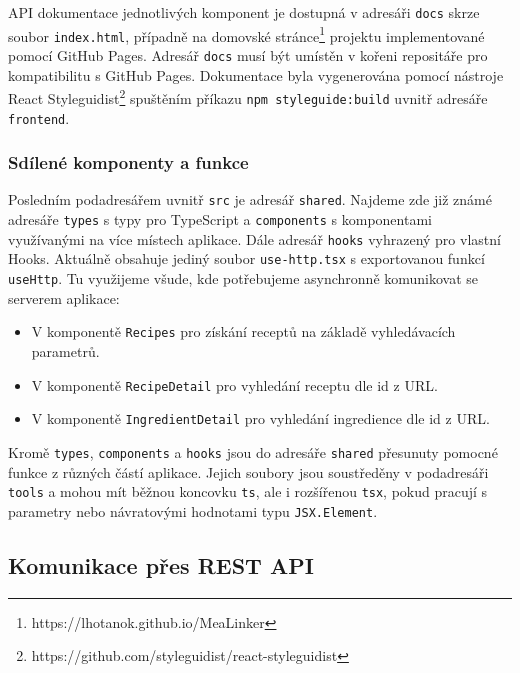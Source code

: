 API dokumentace jednotlivých komponent je dostupná v adresáři \texttt{docs} skrze soubor \texttt{index.html}, případně na domovské stránce\footnote{https://lhotanok.github.io/MeaLinker} projektu implementované pomocí GitHub Pages. Adresář \texttt{docs} musí být umístěn v kořeni repositáře pro kompatibilitu s GitHub Pages. Dokumentace byla vygenerována pomocí nástroje React Styleguidist\footnote{https://github.com/styleguidist/react-styleguidist} spuštěním příkazu \texttt{npm styleguide:build} uvnitř adresáře \texttt{frontend}.

\subsubsection{Sdílené komponenty a funkce}

Posledním podadresářem uvnitř \texttt{src} je adresář \texttt{shared}. Najdeme zde již zná\-mé adresáře \texttt{types} s typy pro TypeScript a \texttt{components} s komponentami využívanými na více místech aplikace. Dále adresář \texttt{hooks} vyhrazený pro vlastní Hooks. Aktuálně obsahuje jediný soubor \texttt{use-http.tsx} s exportovanou funkcí \texttt{useHttp}. Tu využijeme všude, kde potřebujeme asynchronně komunikovat se serverem aplikace: 
\begin{itemize}
    \item V komponentě \texttt{Recipes} pro získání receptů na základě vyhledávacích parametrů.
    \item V komponentě \texttt{RecipeDetail} pro vyhledání receptu dle id z URL.
    \item V komponentě \texttt{IngredientDetail} pro vyhledání ingredience dle id z URL.
\end{itemize}
Kromě \texttt{types}, \texttt{components} a \texttt{hooks} jsou do adresáře \texttt{shared} přesunuty pomocné funkce z různých částí aplikace. Jejich soubory jsou soustředěny v podadresáři \texttt{tools} a mohou mít běžnou koncovku \texttt{ts}, ale i rozšířenou \texttt{tsx}, pokud pracují s parametry nebo návratovými hodnotami typu \texttt{JSX.Element}.

\subsection{Komunikace přes REST API}

